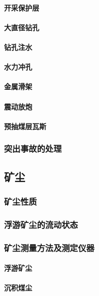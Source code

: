 \documentclass[UTF8]{../../ApplicationUniverse}
\begin{document}
            \paragraph{开采保护层}
            \paragraph{大直径钻孔}
            \paragraph{钻孔注水}
            \paragraph{水力冲孔}
            \paragraph{金属滑架}
            \paragraph{震动放炮}
            \paragraph{预抽煤层瓦斯}
        \subsubsection{突出事故的处理}
    \subsection{矿尘}
        \subsubsection{矿尘性质}
        \subsubsection{浮游矿尘的流动状态}
        \subsubsection{矿尘测量方法及测定仪器}
            \paragraph{浮游矿尘}
            \paragraph{沉积煤尘}
\end{document}
